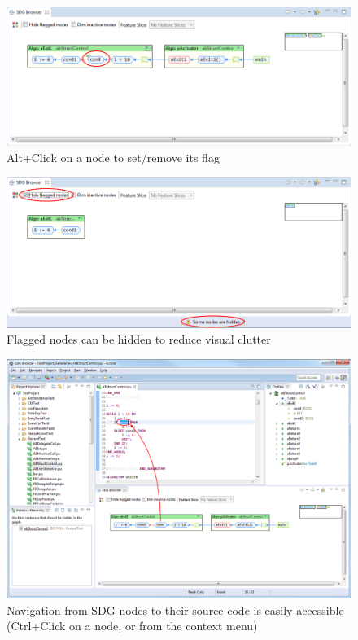 \begin{figure}[p]
  \centering
    \includegraphics[width=\textwidth]{bilder/manual-flag}
  \caption{Alt+Click on a node to set/remove its flag}
  \label{fig:manual-flag}
\end{figure}

\begin{figure}[p]
  \centering
    \includegraphics[width=\textwidth]{bilder/manual-hide_flagged}
  \caption{Flagged nodes can be hidden to reduce visual clutter}
  \label{fig:manual-hide_flagged}
\end{figure}

\begin{figure}[p]
  \centering
    \includegraphics[width=\textwidth]{bilder/manual-show_source}
  \caption{Navigation from SDG nodes to their source code is easily accessible (Ctrl+Click on a node, or from the 
    context menu)}
  \label{fig:manual-show_source}
\end{figure}

